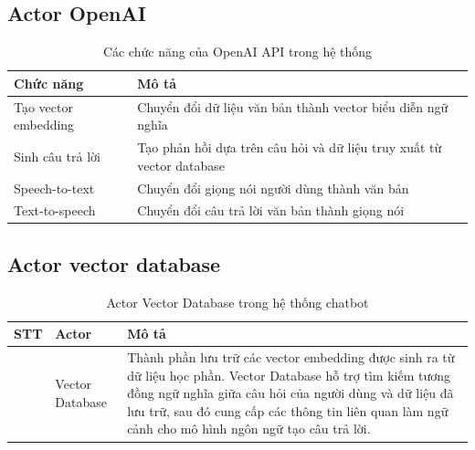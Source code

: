 \documentclass[../DoAn.tex]{subfiles}
\begin{document}
\subsection{Actor OpenAI}
\begin{table}[htbp]
    \centering
    \renewcommand{\arraystretch}{1.8}
    \label{tab:openai_functions}
    \begin{tabular}{|>{\centering\arraybackslash}m{5cm}|>{\arraybackslash}m{9cm}|}
        \hline
        \textbf{Chức năng}   & \textbf{Mô tả}                                                        \\
        \hline
        Tạo vector embedding & Chuyển đổi dữ liệu văn bản thành vector biểu diễn ngữ nghĩa           \\
        \hline
        Sinh câu trả lời     & Tạo phản hồi dựa trên câu hỏi và dữ liệu truy xuất từ vector database \\
        \hline
        Speech-to-text       & Chuyển đổi giọng nói người dùng thành văn bản                         \\
        \hline
        Text-to-speech       & Chuyển đổi câu trả lời văn bản thành giọng nói                        \\
        \hline
    \end{tabular}
    \caption{Các chức năng của OpenAI API trong hệ thống}
\end{table}

\subsection{Actor vector database}
\begin{table}[htbp]
    \centering
    \renewcommand{\arraystretch}{2}
    \label{tab:actor_vector_database}
    \begin{tabular}{|>{\centering\arraybackslash}m{1.2cm}|>{\centering\arraybackslash}m{4cm}|>{\centering\arraybackslash}m{9cm}|}
        \hline
        \textbf{STT} & \textbf{Actor}  & \textbf{Mô tả}                                                                                                                                                                                                                              \\
        \hline
        1            & Vector Database &
        Thành phần lưu trữ các vector embedding được sinh ra từ dữ liệu học phần. Vector Database hỗ trợ tìm kiếm tương đồng ngữ nghĩa giữa câu hỏi của người dùng và dữ liệu đã lưu trữ, sau đó cung cấp các thông tin liên quan làm ngữ cảnh cho mô hình ngôn ngữ tạo câu trả lời. \\
        \hline
    \end{tabular}
    \caption{Actor Vector Database trong hệ thống chatbot}
\end{table}
\end{document}

